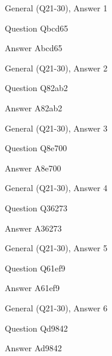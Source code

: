 \documentclass[11pt]{beamer}
\begin{document}
\begin{frame}[t]{General (Q21-30), Answer 1}
\vspace{2em}
\begin{block}{Question}
Qbcd65
\end{block}
\pause{}
\begin{block}{Answer}
Abcd65
\end{block}
\end{frame}
    

\begin{frame}[t]{General (Q21-30), Answer 2}
\vspace{2em}
\begin{block}{Question}
Q82ab2
\end{block}
\pause{}
\begin{block}{Answer}
A82ab2
\end{block}
\end{frame}
    

\begin{frame}[t]{General (Q21-30), Answer 3}
\vspace{2em}
\begin{block}{Question}
Q8e700
\end{block}
\pause{}
\begin{block}{Answer}
A8e700
\end{block}
\end{frame}
    

\begin{frame}[t]{General (Q21-30), Answer 4}
\vspace{2em}
\begin{block}{Question}
Q36273
\end{block}
\pause{}
\begin{block}{Answer}
A36273
\end{block}
\end{frame}
    

\begin{frame}[t]{General (Q21-30), Answer 5}
\vspace{2em}
\begin{block}{Question}
Q61ef9
\end{block}
\pause{}
\begin{block}{Answer}
A61ef9
\end{block}
\end{frame}
    

\begin{frame}[t]{General (Q21-30), Answer 6}
\vspace{2em}
\begin{block}{Question}
Qd9842
\end{block}
\pause{}
\begin{block}{Answer}
Ad9842
\end{block}
\end{frame}
    
\end{document}
